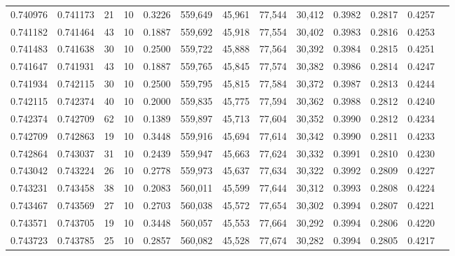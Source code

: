 \begin{tabular}{rrrrrrrrrrrrr}
0.740976 & 0.741173 &    21 &  10 &                                     0.3226 & 559,649 &  45,961 &  77,544 &  30,412 & 0.3982 & 0.2817 & 0.4257 \\
0.741182 & 0.741464 &    43 &  10 &                                     0.1887 & 559,692 &  45,918 &  77,554 &  30,402 & 0.3983 & 0.2816 & 0.4253 \\
0.741483 & 0.741638 &    30 &  10 &                                     0.2500 & 559,722 &  45,888 &  77,564 &  30,392 & 0.3984 & 0.2815 & 0.4251 \\
0.741647 & 0.741931 &    43 &  10 &                                     0.1887 & 559,765 &  45,845 &  77,574 &  30,382 & 0.3986 & 0.2814 & 0.4247 \\
0.741934 & 0.742115 &    30 &  10 &                                     0.2500 & 559,795 &  45,815 &  77,584 &  30,372 & 0.3987 & 0.2813 & 0.4244 \\
0.742115 & 0.742374 &    40 &  10 &                                     0.2000 & 559,835 &  45,775 &  77,594 &  30,362 & 0.3988 & 0.2812 & 0.4240 \\
0.742374 & 0.742709 &    62 &  10 &                                     0.1389 & 559,897 &  45,713 &  77,604 &  30,352 & 0.3990 & 0.2812 & 0.4234 \\
0.742709 & 0.742863 &    19 &  10 &                                     0.3448 & 559,916 &  45,694 &  77,614 &  30,342 & 0.3990 & 0.2811 & 0.4233 \\
0.742864 & 0.743037 &    31 &  10 &                                     0.2439 & 559,947 &  45,663 &  77,624 &  30,332 & 0.3991 & 0.2810 & 0.4230 \\
0.743042 & 0.743224 &    26 &  10 &                                     0.2778 & 559,973 &  45,637 &  77,634 &  30,322 & 0.3992 & 0.2809 & 0.4227 \\
0.743231 & 0.743458 &    38 &  10 &                                     0.2083 & 560,011 &  45,599 &  77,644 &  30,312 & 0.3993 & 0.2808 & 0.4224 \\
0.743467 & 0.743569 &    27 &  10 &                                     0.2703 & 560,038 &  45,572 &  77,654 &  30,302 & 0.3994 & 0.2807 & 0.4221 \\
0.743571 & 0.743705 &    19 &  10 &                                     0.3448 & 560,057 &  45,553 &  77,664 &  30,292 & 0.3994 & 0.2806 & 0.4220 \\
0.743723 & 0.743785 &    25 &  10 &                                     0.2857 & 560,082 &  45,528 &  77,674 &  30,282 & 0.3994 & 0.2805 & 0.4217 \\

\end{tabular}
